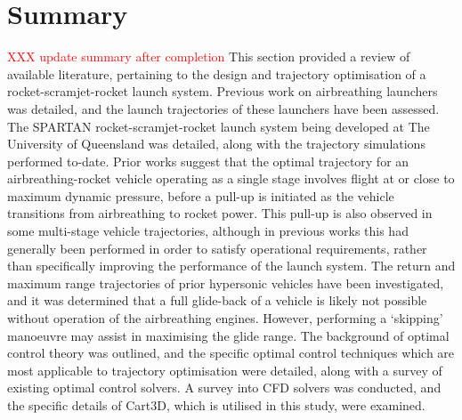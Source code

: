       
      \section{Summary}
\textcolor{red}{XXX update summary after completion}
This section provided a review of available literature, pertaining to the design and trajectory optimisation of a rocket-scramjet-rocket launch system.    
       Previous work on airbreathing launchers was detailed, and the launch trajectories of these launchers have been assessed. 
       The SPARTAN rocket-scramjet-rocket launch system being developed at The University of Queensland was detailed, along with the trajectory simulations performed to-date.
       Prior works suggest that the optimal trajectory for an airbreathing-rocket vehicle operating as a single stage involves flight at or close to maximum dynamic pressure, before a pull-up is initiated as the vehicle transitions from airbreathing to rocket power. This pull-up is also observed in some multi-stage vehicle trajectories, although in previous works this had generally been performed in order to satisfy operational requirements, rather than specifically improving the performance of the launch system. 
       The return and maximum range trajectories of prior hypersonic vehicles have been investigated, and it was determined that a full glide-back of a vehicle is likely not possible without operation of the airbreathing engines. However, performing a `skipping' manoeuvre may assist in maximising the glide range. 
The background of optimal control theory was outlined, and the specific optimal control techniques which are most applicable to trajectory optimisation were detailed, along with a survey of existing optimal control solvers. 
A survey into CFD solvers was conducted, and the specific details of Cart3D, which is utilised in this study, were examined. 